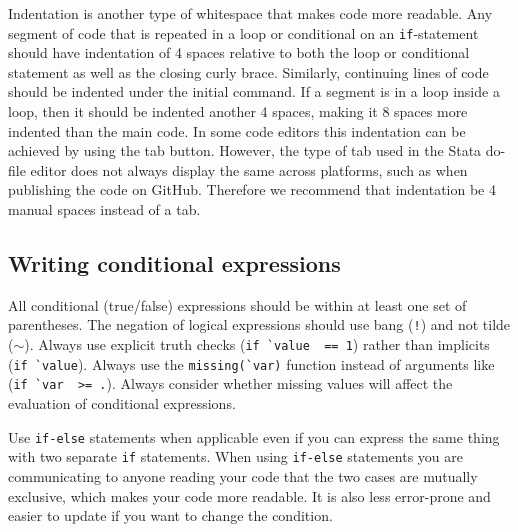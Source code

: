 
\noindent Indentation is another type of whitespace that makes code more readable.
Any segment of code that is repeated in a loop or conditional on an
\texttt{if}-statement should have indentation of 4 spaces relative
to both the loop or conditional statement as well as the closing curly brace.
Similarly, continuing lines of code should be indented under the initial command.
If a segment is in a loop inside a loop, then it should be indented another 4 spaces,
making it 8 spaces more indented than the main code.
In some code editors this indentation can be achieved by using the tab button.
However, the type of tab used in the Stata do-file editor does not always display the same across platforms,
such as when publishing the code on GitHub.
Therefore we recommend that indentation be 4 manual spaces instead of a tab.


\subsection{Writing conditional expressions}

All conditional (true/false) expressions should be within at least one set of parentheses.
The negation of logical expressions should use bang (\texttt{!}) and not tilde ($\sim$).
Always use explicit truth checks (\texttt{if \`{}value\textquotesingle\, == 1})
rather than implicits (\texttt{if \`{}value\textquotesingle}).
Always use the \texttt{missing(\`{}var\textquotesingle)} function
instead of arguments like (\texttt{if \`{}var\textquotesingle\, >= .}).
Always consider whether missing values will affect the evaluation of conditional expressions.


\noindent Use \texttt{if-else} statements when applicable
even if you can express the same thing with two separate \texttt{if} statements.
When using \texttt{if-else} statements you are communicating to anyone reading your code
that the two cases are mutually exclusive, which makes your code more readable.
It is also less error-prone and easier to update if you want to change the condition.


